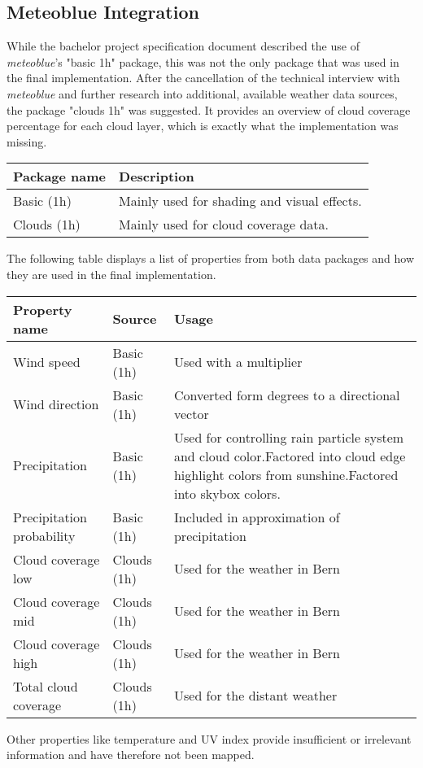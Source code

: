 \subsection{Meteoblue Integration}
\label{section:techimpl:meteoblue}
While the bachelor project specification document described the use of \emph{meteoblue}'s "basic 1h" package, this was not the only package that was used in the final implementation.
After the cancellation of the technical interview with \emph{meteoblue} and further research into additional, available weather data sources, the package "clouds 1h" was suggested.
It provides an overview of cloud coverage percentage for each cloud layer, which is exactly what the implementation was missing.
\emptyline
\begin{tabularx}{\linewidth}{|l|X|}
    \hline
    \textbf{Package name}   & \textbf{Description} \\ \hline
    Basic (1h)              & Mainly used for shading and visual effects. \\ \hline
    Clouds (1h)             & Mainly used for cloud coverage data. \\ \hline
\end{tabularx}
\emptyline
The following table displays a list of properties from both data packages and how they are used in the final implementation.
\emptyline
\begin{tabularx}{\linewidth}{|l|l|X|}
    \hline
    \textbf{Property name}      & \textbf{Source}     & \textbf{Usage}                                 \\ \hline
    Wind speed                  & Basic (1h)          & Used with a multiplier                         \\ \hline
    Wind direction              & Basic (1h)          & Converted form degrees to a directional vector \\ \hline
    Precipitation               & Basic (1h)          & Used for controlling rain particle system and cloud color.\newline Factored into cloud edge highlight colors from sunshine.\newline Factored into skybox colors. \\ \hline
    Precipitation probability   & Basic (1h)          & Included in approximation of precipitation     \\ \hline
    Cloud coverage low          & Clouds (1h)         & Used for the weather in Bern                   \\ \hline
    Cloud coverage mid          & Clouds (1h)         & Used for the weather in Bern                   \\ \hline
    Cloud coverage high         & Clouds (1h)         & Used for the weather in Bern                   \\ \hline
    Total cloud coverage        & Clouds (1h)         & Used for the distant weather                   \\ \hline
\end{tabularx}
\emptyline
Other properties like temperature and UV index provide insufficient or irrelevant information and have therefore not been mapped.

